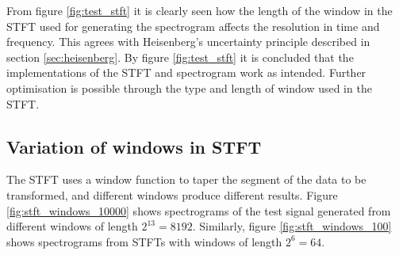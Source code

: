 From figure \ref{fig:test_stft} it is clearly seen how the length of the window in the STFT used for generating the spectrogram affects the resolution in time and frequency. This agrees with Heisenberg's uncertainty principle described in section \ref{sec:heisenberg}. By figure \ref{fig:test_stft} it is concluded that the implementations of the STFT and spectrogram work as intended. Further optimisation is possible through the type and length of window used in the STFT.

\subsection{Variation of windows in STFT}\label{sec:STFT_variation}
The STFT uses a window function to taper the segment of the data to be transformed, and different windows produce different results. Figure \ref{fig:stft_windows_10000} shows spectrograms of the test signal generated from different windows of length $2^{13}=8192$. Similarly, figure \ref{fig:stft_windows_100} shows spectrograms from STFTs with windows of length $2^6=64$.
